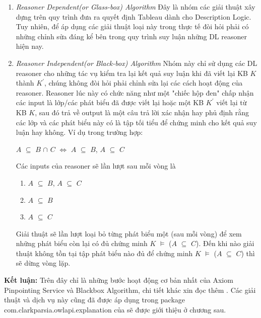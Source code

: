 \begin{enumerate}
	\item \textit{Reasoner Dependent(or Glass-box) Algorithm} Đây là nhóm các giải thuật xây dựng trên quy trình đưa ra quyết định Tableau dành cho Description Logic. Tuy nhiên, để áp dụng các giải thuật loại này trong thực tế đòi hỏi phải có những chỉnh sửa đáng kể bên trong quy trình suy luận những DL reasoner hiện nay.
	\item \textit{Reasoner Independent(or Black-box) Algorithm} Nhóm này chỉ sử dụng các DL reasoner cho những tác vụ kiểm tra lại kết quả suy luận khi đã viết lại KB $K$ thành $K^{'}$, chúng không đòi hỏi phải chỉnh sửa lại các cách hoạt động của reasoner. Reasoner lúc này có chức năng như một "chiếc hộp đen" chấp nhận các input là lớp/các phát biểu đã được viết lại hoặc một KB $K^{'}$ viết lại từ KB $K$, sau đó trả về output là một câu trả lời xác nhận hay phủ định rằng các lớp và các phát biểu này có là tập tối tiểu để chứng minh cho kết quả suy luận hay không. Ví dụ trong trường hợp:
	\begin{center}
		$A$ $\subseteq$ $B$ $\cap$ $C$ $\Leftrightarrow$ $A$ $\subseteq$ $B$, $A$ $\subseteq$ $C$
	\end{center}
	Các inputs của reasoner sẽ lần lượt sau mỗi vòng là 
	\begin{enumerate}
		\item $A$ $\subseteq$ $B$, $A$ $\subseteq$ $C$
		\item $A$ $\subseteq$ $B$
		\item $A$ $\subseteq$ $C$
	\end{enumerate}
	Giải thuật sẽ lần lượt loại bỏ từng phát biểu một (sau mỗi vòng) để xem những phát biểu còn lại có đủ chứng minh  $K$ $\models$ ($A$ $\subseteq$ $C$). Đến khi nào giải thuật không tồn tại tập phát biểu nào đủ để chứng minh $K$ $\models$ ($A$ $\subseteq$ $C$) thì sẽ dừng vòng lặp.
\end{enumerate}
\textbf{Kết luận:} Trên đây chỉ là những bước hoạt động cơ bản nhất của Axiom Pinpointing Service và Blackbox Algorithm, chi tiết khác xin đọc thêm \cite{axiomPinpoint}. Các giải thuật và dịch vụ này cũng đã được áp dụng trong package com.clarkparsia.owlapi.explanation của \cite{owowlapi} sẽ được giới thiệu ở chương sau.
